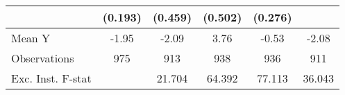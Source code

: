 {\begin{tabular}{l*{5}{c}}
            &     (0.193)         &     (0.459)         &     (0.502)         &     (0.276)         &                     \\
\midrule
Mean Y      &       -1.95         &       -2.09         &        3.76         &       -0.53         &       -2.08         \\
Observations&         975         &         913         &         938         &         936         &         911         \\
Exc. Inst. F-stat&                     &      21.704         &      64.392         &      77.113         &      36.043         \\
\bottomrule
\end{tabular}
}
